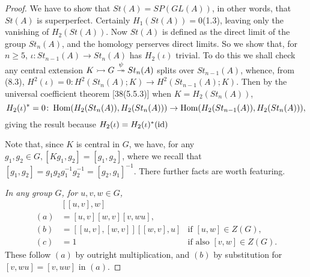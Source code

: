 \begin{proof}
We have to show that $St(A)=SP(GL(A))$, in other words, that $St(A)$ is superperfect. Certainly $H_1(St(A))=0$(1.3), leaving only the vanishing of $H_2(St(A))$. Now $St(A)$ is defined as the direct limit of the group $St_n(A)$, and the homology perserves direct limits. So we show that, for $n\geqslant 5$, $\iota\colon  St_{n-1}(A)\rightarrow St_n(A)$ has $H_2(\iota)$ trivial. To do this we shall check any central extension $K \rightarrowtail G \overset{\psi}{\twoheadrightarrow} St_n(A)$ splits over $St_{n-1}(A)$, whence, from (8.3), $H^2(\iota)=0\colon   H^2(St_n(A);K)\rightarrow H^2(St_{n-1}(A);K)$. Then by the universal coefficient theorem [38(5.5.3)] when $K=H_2(St_n(A))$,
\[H_2(\iota)^*=0\colon   \mathop{\mathrm{Hom}} (H_2(St_n(A)), H_2(St_n(A)))\rightarrow \mathop{\mathrm{Hom}} (H_2(St_{n-1}(A)), H_2(St_n(A))),\]
giving the result because $H_2(\iota)=H_2(\iota)^*(\mathrm{id})$

Note that, since $K$ is central in $G$, we have, for any $g_1,g_2\in G, [Kg_1, g_2]=[g_1, g_2]$, where we recall that $[g_1, g_2]=g_1g_2g_1^{-1}g_2^{-1}=[g_2, g_1]^{-1}$. There further facts are worth featuring.

{\em In any group $G$, for $u,v,w\in G$,}
\begin{equation*}
\begin{array}{rlc}
& [[u,v],w] \\
(a) & =[u,v][w,v][v,wu],\\
(b) &=[[u,v],[w,v]][[w,v],u] &\text{if } [u,w]\in Z(G), \\
(c) &=1 & \text{if also } [v,w]\in Z(G).
\end{array}
\end{equation*}
These follow $(a)$ by outright multiplication, and $(b)$ by substitution for $[v,wu]=[v,uw]$ in $(a)$. 


\end{proof}
